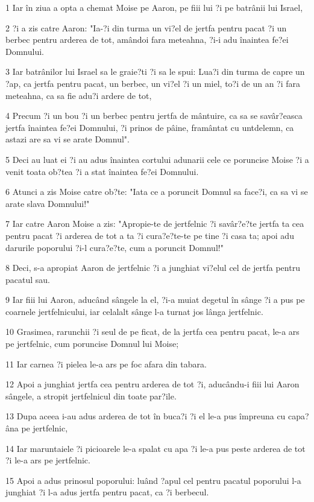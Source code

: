 \par 1 Iar în ziua a opta a chemat Moise pe Aaron, pe fiii lui ?i pe batrânii lui Israel,
\par 2 ?i a zis catre Aaron: "Ia-?i din turma un vi?el de jertfa pentru pacat ?i un berbec pentru arderea de tot, amândoi fara meteahna, ?i-i adu înaintea fe?ei Domnului.
\par 3 Iar batrânilor lui Israel sa le graie?ti ?i sa le spui: Lua?i din turma de capre un ?ap, ca jertfa pentru pacat, un berbec, un vi?el ?i un miel, to?i de un an ?i fara meteahna, ca sa fie adu?i ardere de tot,
\par 4 Precum ?i un bou ?i un berbec pentru jertfa de mântuire, ca sa se savâr?easca jertfa înaintea fe?ei Domnului, ?i prinos de pâine, framântat cu untdelemn, ca astazi are sa vi se arate Domnul".
\par 5 Deci au luat ei ?i au adus înaintea cortului adunarii cele ce poruncise Moise ?i a venit toata ob?tea ?i a stat înaintea fe?ei Domnului.
\par 6 Atunci a zis Moise catre ob?te: "Iata ce a poruncit Domnul sa face?i, ca sa vi se arate slava Domnului!"
\par 7 Iar catre Aaron Moise a zis: "Apropie-te de jertfelnic ?i savâr?e?te jertfa ta cea pentru pacat ?i arderea de tot a ta ?i cura?e?te-te pe tine ?i casa ta; apoi adu darurile poporului ?i-l cura?e?te, cum a poruncit Domnul!"
\par 8 Deci, s-a apropiat Aaron de jertfelnic ?i a junghiat vi?elul cel de jertfa pentru pacatul sau.
\par 9 Iar fiii lui Aaron, aducând sângele la el, ?i-a muiat degetul în sânge ?i a pus pe coarnele jertfelnicului, iar celalalt sânge l-a turnat jos lânga jertfelnic.
\par 10 Grasimea, rarunchii ?i seul de pe ficat, de la jertfa cea pentru pacat, le-a ars pe jertfelnic, cum poruncise Domnul lui Moise;
\par 11 Iar carnea ?i pielea le-a ars pe foc afara din tabara.
\par 12 Apoi a junghiat jertfa cea pentru arderea de tot ?i, aducându-i fiii lui Aaron sângele, a stropit jertfelnicul din toate par?ile.
\par 13 Dupa aceea i-au adus arderea de tot în buca?i ?i el le-a pus împreuna cu capa?âna pe jertfelnic,
\par 14 Iar maruntaiele ?i picioarele le-a spalat cu apa ?i le-a pus peste arderea de tot ?i le-a ars pe jertfelnic.
\par 15 Apoi a adus prinosul poporului: luând ?apul cel pentru pacatul poporului l-a junghiat ?i l-a adus jertfa pentru pacat, ca ?i berbecul.
